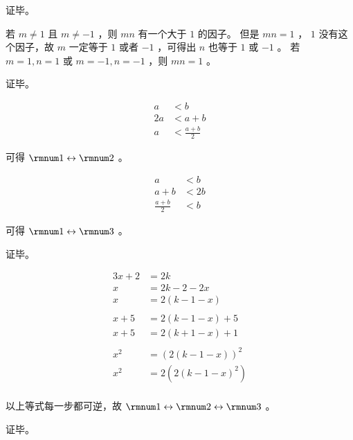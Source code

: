 {{\begin{practices}
            证毕。
        \end{practices}

        \begin{practices}
            若 $m \neq 1$ 且 $m \neq -1$ ，则 $mn$ 有一个大于 $1$ 的因子。
            但是 $mn = 1$ ， $1$ 没有这个因子，故 $m$ 一定等于 $1$ 或者 $-1$ ，可得出 $n$ 也等于 $1$ 或 $-1$ 。
            若 $m = 1, n = 1$ 或 $m = -1, n = -1$ ，则 $mn = 1$ 。

            证毕。
        \end{practices}

        \begin{practices}
            \begin{align*}
                a &< b \\
                2a &< a + b \\
                a &< \frac{a + b}{2}
            \end{align*}

            可得 $\rmnum 1 \leftrightarrow \rmnum 2$ 。

            \begin{align*}
                a &< b \\
                a + b &< 2b \\
                \frac{a + b}{2} &< b
            \end{align*}

            可得 $\rmnum 1 \leftrightarrow \rmnum 3$ 。

            证毕。
        \end{practices}

        \begin{practices}
            \begin{align*}
                3x + 2 &= 2k \\
                x &= 2k - 2 - 2x \\
                x &= 2(k - 1 - x) \\
                \\
                x + 5 &= 2(k - 1 - x) + 5 \\
                x + 5 &= 2(k + 1 - x) + 1 \\
                \\
                x^2 &= (2(k - 1 - x))^2 \\
                x^2 &= 2(2(k - 1 - x)^2) \\
            \end{align*}

            以上等式每一步都可逆，故 $\rmnum 1 \leftrightarrow \rmnum 2 \leftrightarrow \rmnum 3$ 。

            证毕。
        \end{practices}
    }
}